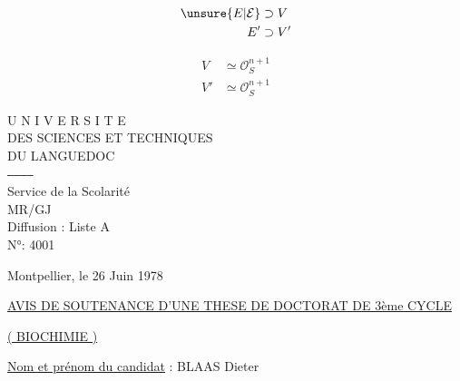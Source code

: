 \[\begin{aligned}\unsure{E|\mathcal E}&\supset V\\ E'&\supset V'\end{aligned}\]



\[
\begin{aligned}V&\simeq\mathcal O_S^{n+1}\\V'&\simeq\mathcal O_S^{n+1}\end{aligned}
\]



U N I V E R S I T E\\
DES SCIENCES ET TECHNIQUES\\
DU LANGUEDOC\\
\texttt{------------}\\
Service de la Scolarité\\
MR/GJ\\
Diffusion : Liste A\\
N°: 4001

Montpellier, le 26 Juin 1978

\uline{AVIS DE SOUTENANCE D'UNE THESE DE DOCTORAT DE 3ème CYCLE}

\uline{( BIOCHIMIE )}

\uline{Nom et prénom du candidat} : BLAAS Dieter

